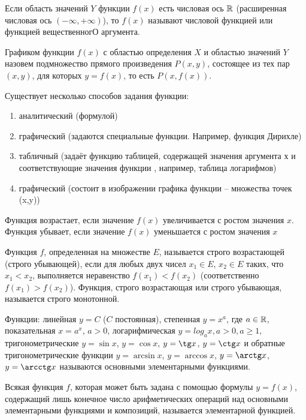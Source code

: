 \documentclass{article}
\begin{document}


Если область значений $Y$ функции $f
	(x)$ есть числовая ось $\mathbb{R}$ (расширенная числовая ось $(-\infty,+\infty)$), то $f(x)$ называют числовой функцией или функцией вещественногО аргумента.


Графиком функции $f(x)$ с областью определения $X$ и областью значений $Y$ назовем подмножество прямого произведения $P(x,y)$, состоящее из тех пар $(x,y)$, для которых $y=f(x)$, то есть $P(x,f(x))$.

Существует несколько способов задания функции:
\begin{enumerate}
	\item{}аналитический (формулой)
	\item{}графический (задаются специальные функции. Например, функция Дирихле)
	\item табличный (задаёт функцию таблицей, содержащей значения аргумента х и соответствующие значения функции , например, таблица логарифмов)
	\item графический (состоит в изображении графика функции – множества точек (x,y))
\end{enumerate}


Функция возрастает, если значение $f(x)$ увеличивается с ростом значения $x$.
Функция убывает, если значение $f(x)$ уменьшается с ростом значения $x$


Функция $f$, определенная на множестве $E$, называется строго возрастающей (строго убывающей), если для любых двух чисел $x_1 \in E$, $x_2 \in E$ таких, что $x_1 < x_2$, выполняется неравенство $f(x_1) < f(x_2)$ (соответственно $f(x_1) > f(x_2)$). Функция, строго возрастающая или строго убывающая, называется строго монотонной.


Функции: линейная $y=C$ ($C$ постоянная), степенная $y=x^a$, где $a \in \mathbb{R}$, показательная $x=a^x$, $a > 0$, логарифмическая $y = log_a x, a > 0, a \geq 1,$ тригонометрические $y = \sin x$, $y = \cos x$, $y = \tg x$, $y = \ctg x$ и обратные тригонометрические функции $y = \arcsin x$, $y = \arccos x$, $y = \arctg x$, $y = \arcctg x$ называются основными элементарными функциями.

Всякая функция $f$, которая может быть задана с помощью формулы $y = f(x)$, содержащий лишь конечное число арифметических операций над основными элементарными функциями и композиций, называется элементарной
функцией.
\end{document}
